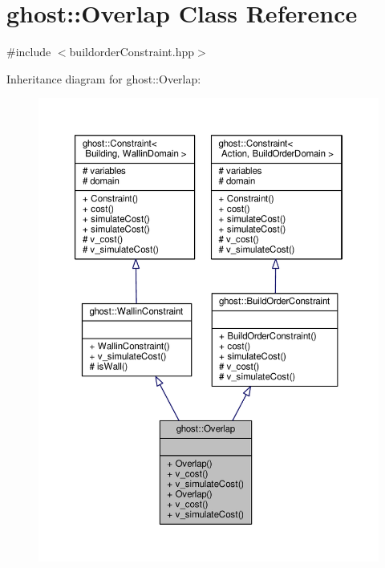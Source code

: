 \hypertarget{classghost_1_1Overlap}{\section{ghost\-:\-:Overlap Class Reference}
\label{classghost_1_1Overlap}
}


{\ttfamily \#include $<$buildorder\-Constraint.\-hpp$>$}



Inheritance diagram for ghost\-:\-:Overlap\-:
\nopagebreak
\begin{figure}[H]
\begin{center}
\leavevmode
\includegraphics[width=350pt]{classghost_1_1Overlap__inherit__graph}
\end{center}
\end{figure}


